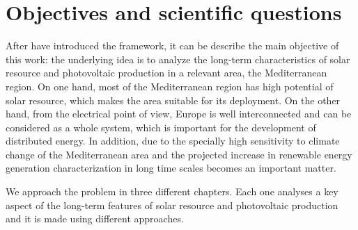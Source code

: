  

\section{Objectives and scientific questions}%


After have introduced the framework, it can be describe the main objective of this work: the underlying idea is to analyze the long-term characteristics of solar resource and photovoltaic production in a relevant area, the Mediterranean region. On one hand, most of the Mediterranean region has high potential of solar resource, which makes the area suitable for its deployment. On the other hand, from the electrical point of view, Europe is well interconnected and can be considered as a whole system, which is important for the development of distributed energy. In addition, due to the specially high sensitivity to climate change of the Mediterranean area and the projected increase in renewable energy generation characterization in long time scales becomes an important matter.

We approach the problem in three different chapters. Each one analyses a key aspect of the long-term features of solar resource and photovoltaic production and it is made using different approaches.

